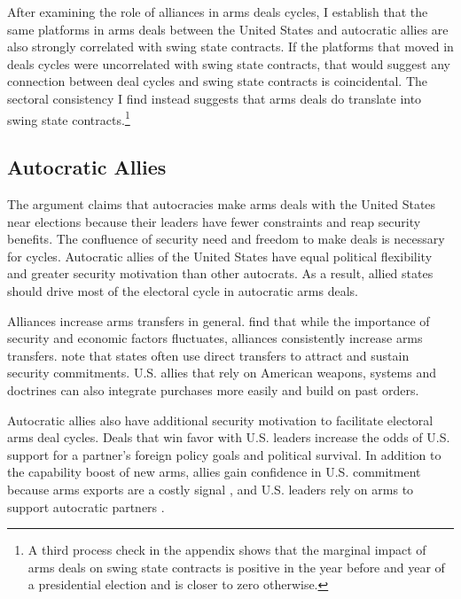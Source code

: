 \documentclass[12pt]{article}
\begin{document}
After examining the role of alliances in arms deals cycles, I establish that the same platforms in arms deals between the United States and autocratic allies are also strongly correlated with swing state contracts.
If the platforms that moved in deals cycles were uncorrelated with swing state contracts, that would suggest any connection between deal cycles and swing state contracts is coincidental.
The sectoral consistency I find instead suggests that arms deals do translate into swing state contracts.\footnote{A third process check in the appendix shows that the marginal impact of arms deals on swing state contracts is positive in the year before and year of a presidential election and is closer to zero otherwise.}



\subsection{Autocratic Allies}


The argument claims that autocracies make arms deals with the United States near elections because their leaders have fewer constraints and reap security benefits. 
The confluence of security need and freedom to make deals is necessary for cycles. 
Autocratic allies of the United States have equal political flexibility and greater security motivation than other autocrats. 
As a result, allied states should drive most of the electoral cycle in autocratic arms deals.


Alliances increase arms transfers in general. 
\citet{Thurneretal2019} find that while the importance of security and economic factors fluctuates, alliances consistently increase arms transfers.
\citet[pg. 184-5]{IkenberryGrieco2003} note that states often use direct transfers to attract and sustain security commitments. 
U.S. allies that rely on American weapons, systems and doctrines can also integrate purchases more easily and build on past orders. 


Autocratic allies also have additional security motivation to facilitate electoral arms deal cycles. 
Deals that win favor with U.S. leaders increase the odds of U.S. support for a partner's foreign policy goals and political survival.  
In addition to the capability boost of new arms, allies gain confidence in U.S. commitment because arms exports are a costly signal \citep{McManusYarhi-Milo2017}, and U.S. leaders rely on arms to support autocratic partners \citep{Yarhi-Miloetal2016}.
\end{document}
